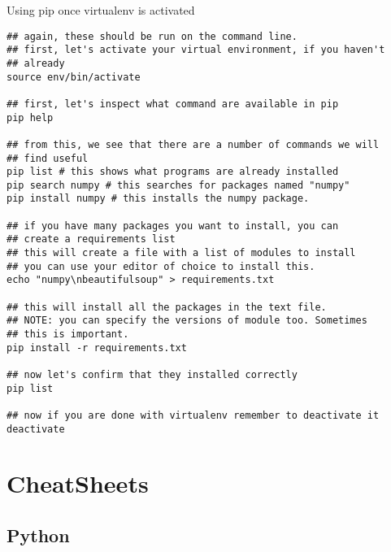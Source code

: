 \documentclass[presentation]{beamer}
\begin{document}
\begin{frame}[fragile,shrink=1,label=sec-9-0-7]{Using pip once virtualenv is activated}

 \lstset{numbers=left,language=sh,label= ,caption= }
\begin{lstlisting}
## again, these should be run on the command line. 
## first, let's activate your virtual environment, if you haven't 
## already
source env/bin/activate

## first, let's inspect what command are available in pip
pip help

## from this, we see that there are a number of commands we will 
## find useful
pip list # this shows what programs are already installed
pip search numpy # this searches for packages named "numpy"
pip install numpy # this installs the numpy package. 

## if you have many packages you want to install, you can 
## create a requirements list
## this will create a file with a list of modules to install
## you can use your editor of choice to install this. 
echo "numpy\nbeautifulsoup" > requirements.txt

## this will install all the packages in the text file. 
## NOTE: you can specify the versions of module too. Sometimes
## this is important. 
pip install -r requirements.txt

## now let's confirm that they installed correctly
pip list 

## now if you are done with virtualenv remember to deactivate it
deactivate
\end{lstlisting}
\end{frame}



\section{CheatSheets}
\label{sec-10}

\subsection{Python}
\label{sec-10-1}
\end{document}
